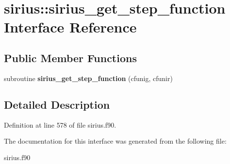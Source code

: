 \hypertarget{interfacesirius_1_1sirius__get__step__function}{}\section{sirius\+:\+:sirius\+\_\+get\+\_\+step\+\_\+function Interface Reference}
\label{interfacesirius_1_1sirius__get__step__function}
\subsection*{Public Member Functions}
\begin{DoxyCompactItemize}
\item 
\hypertarget{interfacesirius_1_1sirius__get__step__function_a1890f0a0c802a21a2bf574faa3fc5d0f}{}subroutine {\bfseries sirius\+\_\+get\+\_\+step\+\_\+function} (cfunig, cfunir)\label{interfacesirius_1_1sirius__get__step__function_a1890f0a0c802a21a2bf574faa3fc5d0f}

\end{DoxyCompactItemize}


\subsection{Detailed Description}


Definition at line 578 of file sirius.\+f90.



The documentation for this interface was generated from the following file\+:\begin{DoxyCompactItemize}
\item 
sirius.\+f90\end{DoxyCompactItemize}
